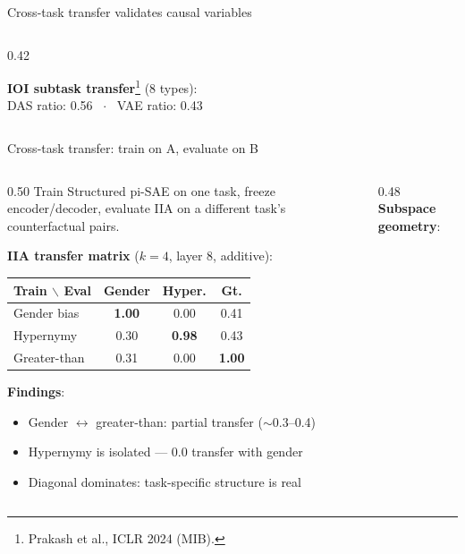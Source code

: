 \documentclass[aspectratio=169,11pt]{beamer}
\begin{document}
\begin{frame}{Cross-task transfer validates causal variables}
\begin{columns}[T]
\begin{column}{0.42\textwidth}

\vspace{0.3em}
{\scriptsize \textbf{IOI subtask transfer}\footnote{\tiny Prakash et al., ICLR 2024 (MIB).} (8 types):}\\
{\scriptsize DAS ratio: 0.56 ~$\cdot$~ VAE ratio: 0.43}
\end{column}
\end{columns}
\end{frame}

\begin{frame}{Cross-task transfer: train on A, evaluate on B}

\begin{columns}[T]
\begin{column}{0.50\textwidth}
{\scriptsize Train Structured pi-SAE on one task, freeze encoder/decoder, evaluate IIA on a different task's counterfactual pairs.}

\vspace{0.3em}
{\scriptsize \textbf{IIA transfer matrix} ($k{=}4$, layer 8, additive):}

\vspace{0.2em}
{\scriptsize\centering
\setlength{\tabcolsep}{3pt}
\renewcommand{\arraystretch}{1.05}
\begin{tabular}{@{}l|ccc@{}}
\toprule
\textbf{Train $\backslash$ Eval} & \textbf{Gender} & \textbf{Hyper.} & \textbf{Gt.} \\
\midrule
Gender bias  & \textbf{1.00} & 0.00 & 0.41 \\
Hypernymy    & 0.30 & \textbf{0.98} & 0.43 \\
Greater-than & 0.31 & 0.00 & \textbf{1.00} \\
\bottomrule
\end{tabular}
}

\vspace{0.3em}
{\scriptsize \textbf{Findings}:}
\begin{itemize}\setlength{\itemsep}{1pt}
  \item {\scriptsize Gender $\leftrightarrow$ greater-than: partial transfer ($\sim$0.3--0.4)}
  \item {\scriptsize Hypernymy is isolated --- 0.0 transfer with gender}
  \item {\scriptsize Diagonal dominates: task-specific structure is real}
\end{itemize}
\end{column}
\begin{column}{0.48\textwidth}
{\scriptsize \textbf{Subspace geometry}:}


\end{column}
\end{columns}
\end{frame}
\end{document}
